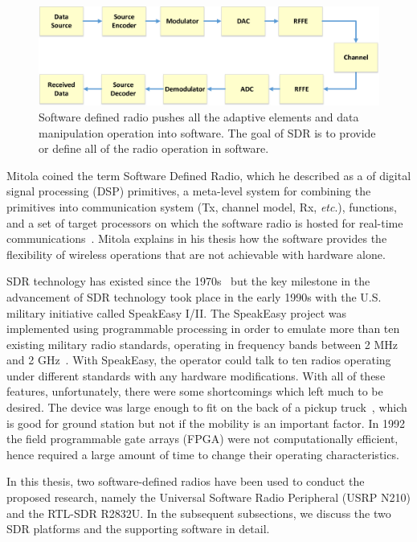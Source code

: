 \begin{figure}[ht!]
	\centering
	\includegraphics[width=\textwidth,keepaspectratio]{images/Gill/figs/softwaredefinedradio.eps}
    \caption{Software defined radio pushes all the adaptive elements and data manipulation operation into software. The goal of SDR is to provide or define all of the radio operation in software.} 
\label{sdr}      
\end{figure}

Mitola coined the term Software Defined Radio, which he described as a of digital signal processing (DSP) primitives, a meta-level system for combining the primitives into communication system (Tx, channel model, Rx, \textit{etc}.), functions, and a set of target processors on which the software radio is hosted for real-time communications~\cite{267870}. Mitola explains in his thesis how the software provides the flexibility of wireless operations that are not achievable with hardware alone.

SDR technology has existed since the 1970s~\cite{bookhtn1} but the key milestone in the advancement of SDR technology took place in the early 1990s with the U.S. military initiative called SpeakEasy I/II. The SpeakEasy project was implemented using programmable processing in order to emulate more than ten existing military radio standards, operating in frequency bands between 2 MHz and 2 GHz~\cite{392998}. With SpeakEasy, the operator could talk to ten radios operating under different standards with any hardware modifications. With all of these features, unfortunately, there were some shortcomings which left much to be desired. The device was large enough to fit on the back of a pickup truck~\cite{392998}, which is good for ground station but not if the mobility is an important factor. In 1992 the field programmable gate arrays (FPGA) were not computationally efficient, hence required a large amount of time to change their operating characteristics. 

In this thesis, two software-defined radios have been used to conduct the proposed research, namely the Universal Software Radio Peripheral (USRP N210) and the RTL-SDR R2832U. In the subsequent subsections, we discuss the two SDR platforms and the supporting software in detail.

